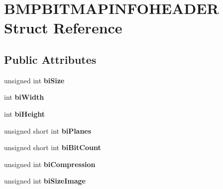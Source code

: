 \hypertarget{struct_b_m_p_b_i_t_m_a_p_i_n_f_o_h_e_a_d_e_r}{}\section{B\+M\+P\+B\+I\+T\+M\+A\+P\+I\+N\+F\+O\+H\+E\+A\+D\+ER Struct Reference}
\label{struct_b_m_p_b_i_t_m_a_p_i_n_f_o_h_e_a_d_e_r}
\subsection*{Public Attributes}
\begin{DoxyCompactItemize}
\item 
unsigned int {\bfseries bi\+Size}\hypertarget{struct_b_m_p_b_i_t_m_a_p_i_n_f_o_h_e_a_d_e_r_ae2d32afa05b795197e27953edf95e194}{}\label{struct_b_m_p_b_i_t_m_a_p_i_n_f_o_h_e_a_d_e_r_ae2d32afa05b795197e27953edf95e194}

\item 
int {\bfseries bi\+Width}\hypertarget{struct_b_m_p_b_i_t_m_a_p_i_n_f_o_h_e_a_d_e_r_ac33a1b0d9cfd93e3aec186547b185b71}{}\label{struct_b_m_p_b_i_t_m_a_p_i_n_f_o_h_e_a_d_e_r_ac33a1b0d9cfd93e3aec186547b185b71}

\item 
int {\bfseries bi\+Height}\hypertarget{struct_b_m_p_b_i_t_m_a_p_i_n_f_o_h_e_a_d_e_r_a21b4a8ddc0c4046fcc8761b80c667424}{}\label{struct_b_m_p_b_i_t_m_a_p_i_n_f_o_h_e_a_d_e_r_a21b4a8ddc0c4046fcc8761b80c667424}

\item 
unsigned short int {\bfseries bi\+Planes}\hypertarget{struct_b_m_p_b_i_t_m_a_p_i_n_f_o_h_e_a_d_e_r_ad871d4ce7ba7fb1ec084d7bf1d79e8c1}{}\label{struct_b_m_p_b_i_t_m_a_p_i_n_f_o_h_e_a_d_e_r_ad871d4ce7ba7fb1ec084d7bf1d79e8c1}

\item 
unsigned short int {\bfseries bi\+Bit\+Count}\hypertarget{struct_b_m_p_b_i_t_m_a_p_i_n_f_o_h_e_a_d_e_r_a8defb655f41fa5b88bbaad2205d617b9}{}\label{struct_b_m_p_b_i_t_m_a_p_i_n_f_o_h_e_a_d_e_r_a8defb655f41fa5b88bbaad2205d617b9}

\item 
unsigned int {\bfseries bi\+Compression}\hypertarget{struct_b_m_p_b_i_t_m_a_p_i_n_f_o_h_e_a_d_e_r_a9d254b3d4f8d4fbc3030c44f8cbaedbb}{}\label{struct_b_m_p_b_i_t_m_a_p_i_n_f_o_h_e_a_d_e_r_a9d254b3d4f8d4fbc3030c44f8cbaedbb}

\item 
unsigned int {\bfseries bi\+Size\+Image}\hypertarget{struct_b_m_p_b_i_t_m_a_p_i_n_f_o_h_e_a_d_e_r_ab1957b393790ffeeb511ce1b5c6b3acc}{}\label{struct_b_m_p_b_i_t_m_a_p_i_n_f_o_h_e_a_d_e_r_ab1957b393790ffeeb511ce1b5c6b3acc}


\end{DoxyCompactItemize}
